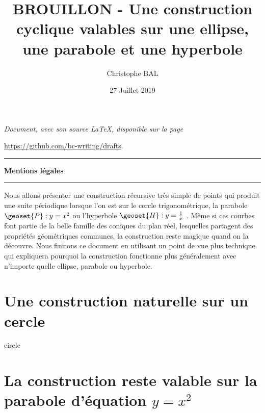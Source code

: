\documentclass[12pt]{amsart}
\begin{document}
\title{BROUILLON - Une construction cyclique valables sur une ellipse, une parabole et une hyperbole}
\author{Christophe BAL}
\date{27 Juillet 2019}

\maketitle

\begin{center}
	\itshape
	Document, avec son source \LaTeX, disponible sur la page
	
	\url{https://github.com/bc-writing/drafts}.
\end{center}


\bigskip


\begin{center}
	\hrule\vspace{.3em}
	{
		\fontsize{1.35em}{1em}\selectfont
		\textbf{Mentions \og légales \fg}
	}
			
	\vspace{0.45em}
	\doclicenseThis
	\hrule
\end{center}


\setcounter{tocdepth}{2}
\tableofcontents


Nous allons présenter une construction récursive très simple de points qui produit une suite périodique lorsque l'on est sur le cercle trigonométrique, la parabole $\geoset{P} : y = x^2$ ou l'hyperbole $\geoset{H} : y = \frac{1}{x}$ .
Même si ces courbes font partie de la belle famille des coniques du plan réel, lesquelles partagent des propriétés géométriques communes, la construction reste magique quand on la découvre.
Nous finirons ce document en utilisant un point de vue plus technique qui expliquera pourquoi la construction fonctionne plus généralement avec n'importe quelle ellipse, parabole ou hyperbole. 




\section{Une construction naturelle sur un cercle}
\label{circle}

{circle}




\section{\texorpdfstring{La construction reste valable sur la parabole d'équation $y = x^2$}%
                        {La construction reste valable sur la parabole d'équation y = x**2}}
\label{parabola}
\end{document}
